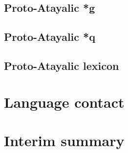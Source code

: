 \subsection{Proto-Atayalic *g}
\lipsum[1-5]
\subsection{Proto-Atayalic *q}
\lipsum[1-5]
\subsection{Proto-Atayalic lexicon}
\lipsum[1-5]


\section{Language contact}
\lipsum[1-25]


\section{Interim summary}
\lipsum[1-4]